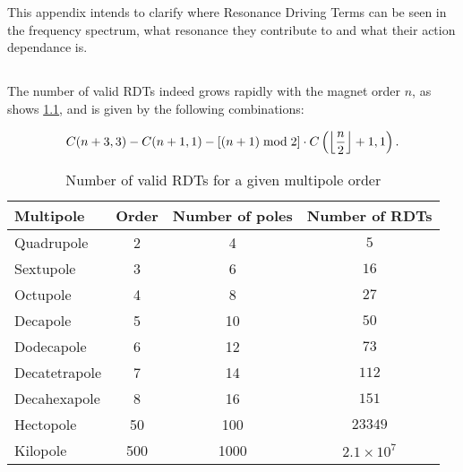 \chapter{}
\label{appendix:rdts}
\thumbforappendix
\par

This appendix intends to clarify where Resonance Driving Terms can be seen in the frequency
spectrum, what resonance they contribute to and what their action dependance is.  


\section{}

The number of valid RDTs indeed grows rapidly with the magnet order $n$, as shows
\cref{table:appendix:number_rdts}, and is given by the following combinations:

\begin{equation}
    C(n+3, 3) - C(n+1,1) - \left[(n+1) \;\mathrm{mod}\; 2\right] \cdot C\left(\floor*{\frac{n}{2}}+1, 1\right).
    \label{eq:number_rdts}
\end{equation}

\begin{table}[H]
  \centering
  \begin{tabular}{lccc}
  Multipole     & Order & Number of poles & Number of RDTs             \\
  \hline
  Quadrupole    & 2     & 4    & $5  $                                 \\ 
  Sextupole     & 3     & 6    & $16  $                                \\ 
  Octupole      & 4     & 8    & $27  $                                \\ 
  Decapole      & 5     & 10   & $50  $                                \\ 
  Dodecapole    & 6     & 12   & $73  $                                \\ 
  Decatetrapole & 7     & 14   & $112  $                               \\ 
  Decahexapole  & 8     & 16   & $151  $                               \\ 
  Hectopole     & 50    & 100  & $23349  $                             \\
  Kilopole      & 500   & 1000 & $2.1 \times 10^7$ \\ \hline
  \end{tabular}
  \caption{Number of valid RDTs for a given multipole order}
  \label{table:appendix:number_rdts}
\end{table}



